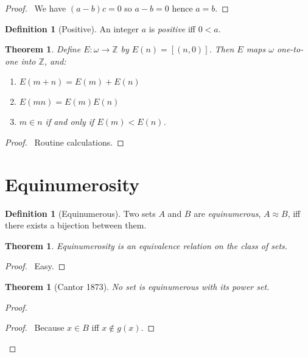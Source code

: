 \documentclass{article}
\let\qed\relax
\newtheorem{theorem}[axiom]{Theorem}
\theoremstyle{definition}
\newtheorem{definition}[axiom]{Definition}
\begin{document}
    \begin{proof}
        \pf\ We have $(a-b)c = 0$ so $a-b = 0$ hence $a = b$. \qed
    \end{proof}

    \begin{definition}[Positive]
        An integer $a$ is \emph{positive} iff $0 < a$.
    \end{definition}

    \begin{theorem}
        Define $E : \omega \rightarrow \mathbb{Z}$ by $E(n) = [(n,0)]$. Then $E$ maps $\omega$ one-to-one
        into $\mathbb{Z}$, and:
        \begin{enumerate}
            \item $E(m+n) = E(m) + E(n)$
            \item $E(mn) = E(m) E(n)$
            \item $m \in n$ if and only if $E(m) < E(n)$.
        \end{enumerate}
    \end{theorem}

    \begin{proof}
        \pf\ Routine calculations. \qed
    \end{proof}

    \section{Equinumerosity}

    \begin{definition}[Equinumerous]
        Two sets $A$ and $B$ are \emph{equinumerous}, $A \approx B$, iff there exists a bijection between
        them.
    \end{definition}

    \begin{theorem}
        Equinumerosity is an equivalence relation on the class of sets.
    \end{theorem}

    \begin{proof}
        \pf\ Easy. \qed
    \end{proof}

    \begin{theorem}[Cantor 1873]
        No set is equinumerous with its power set.
    \end{theorem}

    \begin{proof}
        \pf
        \begin{proof}
            \pf\ Because $x \in B$ iff $x \notin g(x)$.
        \end{proof}
        \qed
    \end{proof}
\end{document}

